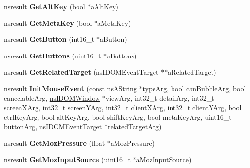 \begin{DoxyCompactItemize}
nsresult {\bfseries Get\+Alt\+Key} (bool $\ast$a\+Alt\+Key)
\item 
\mbox{\label{interfacens_i_d_o_m_mouse_event_a33681c134d637c84d44385dbbc2696bf}} 
nsresult {\bfseries Get\+Meta\+Key} (bool $\ast$a\+Meta\+Key)
\item 
\mbox{\label{interfacens_i_d_o_m_mouse_event_ae26fe443e7ff690a4f81be3fe0ac7637}} 
nsresult {\bfseries Get\+Button} (int16\+\_\+t $\ast$a\+Button)
\item 
\mbox{\label{interfacens_i_d_o_m_mouse_event_ae63b6f46ffc1e0a27390c1d133a1050c}} 
nsresult {\bfseries Get\+Buttons} (uint16\+\_\+t $\ast$a\+Buttons)
\item 
\mbox{\label{interfacens_i_d_o_m_mouse_event_a1a90e62f19fc7a7ab426b42fc993547a}} 
nsresult {\bfseries Get\+Related\+Target} (\hyperlink{interfacens_i_d_o_m_event_target}{ns\+I\+D\+O\+M\+Event\+Target} $\ast$$\ast$a\+Related\+Target)
\item 
\mbox{\label{interfacens_i_d_o_m_mouse_event_ab87dc72172a6c062ab83b7de87e7636a}} 
nsresult {\bfseries Init\+Mouse\+Event} (const \hyperlink{structns_string_container}{ns\+A\+String} $\ast$type\+Arg, bool can\+Bubble\+Arg, bool cancelable\+Arg, \hyperlink{interfacens_i_d_o_m_window}{ns\+I\+D\+O\+M\+Window} $\ast$view\+Arg, int32\+\_\+t detail\+Arg, int32\+\_\+t screen\+X\+Arg, int32\+\_\+t screen\+Y\+Arg, int32\+\_\+t client\+X\+Arg, int32\+\_\+t client\+Y\+Arg, bool ctrl\+Key\+Arg, bool alt\+Key\+Arg, bool shift\+Key\+Arg, bool meta\+Key\+Arg, uint16\+\_\+t button\+Arg, \hyperlink{interfacens_i_d_o_m_event_target}{ns\+I\+D\+O\+M\+Event\+Target} $\ast$related\+Target\+Arg)
\item 
\mbox{\label{interfacens_i_d_o_m_mouse_event_a84acb87e5a1947f09a094f49ce3569a5}} 
nsresult {\bfseries Get\+Moz\+Pressure} (float $\ast$a\+Moz\+Pressure)
\item 
\mbox{\label{interfacens_i_d_o_m_mouse_event_a7fd546eea363032a8fea24b49f1a33fd}} 
nsresult {\bfseries Get\+Moz\+Input\+Source} (uint16\+\_\+t $\ast$a\+Moz\+Input\+Source)
$$
\end{DoxyCompactItemize}
